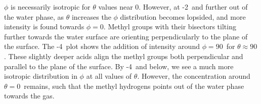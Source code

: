 $\phi$ is necessarily isotropic for $\theta$ values near 0\textdegree. However, at -2\angs~and further out of the water phase, as $\theta$ increases the $\phi$ distribution becomes lopsided, and more intensity is found towards $\phi=0$\textdegree. Methyl groups with their bisectors tilting further towards the water surface are orienting perpendicularly to the plane of the surface. The -4\angs~plot shows the addition of intensity around $\phi=90$\textdegree~for $\theta \approx 90$\textdegree. These slightly deeper acids align the methyl groups both perpendicular and parallel to the plane of the surface. By -4\angs~and below, we see a much more isotropic distribution in $\phi$ at all values of $\theta$. However, the concentration around $\theta=0$\textdegree~remains, such that the methyl hydrogens points out of the water phase towards the gas.
